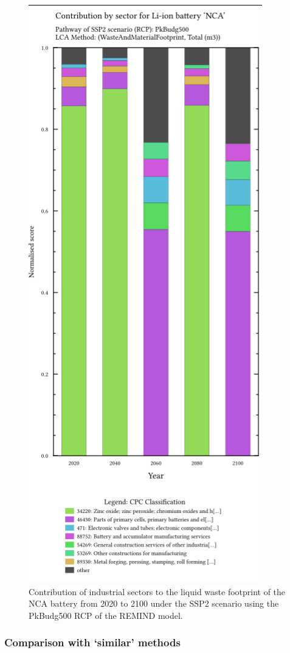 \begin{figure}[H]
    \centering
    \includegraphics[width=0.6\linewidth]{figures/cpc_contribution.png
    }
    \caption{Contribution of industrial sectors to the liquid waste footprint of the NCA battery from 2020 to 2100 under the SSP2 scenario using the PkBudg500 RCP of the REMIND model.}\label{fig:cpc_contribution}
\end{figure}


\subsubsection{Comparison with `similar' methods}\label{sec:results-case_study-methodcomparison}


